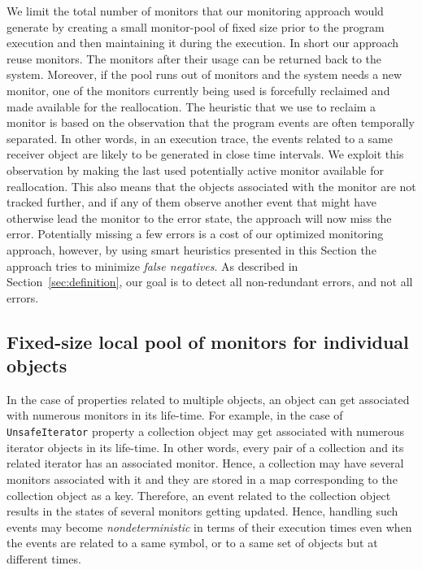 We limit the total number of 
monitors that our monitoring approach would generate by creating a small 
monitor-pool of fixed size prior to the program execution and then maintaining 
it during the execution. In short our approach reuse monitors. The monitors 
after their usage can be returned back to the system. Moreover, if the pool runs 
out of monitors and the system needs a new monitor, one of the monitors currently being 
used is forcefully reclaimed and made available for the reallocation. The 
heuristic that we use to reclaim a monitor is based on the observation that the 
program events are often temporally separated. In other words, in an execution 
trace, the events related to a same receiver object are likely to be generated 
in close time intervals. We exploit this observation by making the last used potentially active 
monitor available for reallocation. This also means that the objects associated with the monitor
are not tracked further, and if any of them observe another event that might have otherwise
lead the monitor to the error state, the approach will now miss the error. 
Potentially missing a few errors is a cost of our optimized monitoring approach, 
however, by using smart heuristics presented in this Section the approach tries to
minimize \textit{false negatives}. As described in Section~\ref{sec:definition}, our
goal is to detect all non-redundant errors, and not all errors.

\subsection{Fixed-size local pool of monitors for individual objects}

In the case of properties related to multiple objects, 
an object can get associated with numerous monitors in its life-time. For example,
in the case of \texttt{UnsafeIterator} property a collection object may get associated
with numerous iterator objects in its life-time. In other words, every pair of a collection and its related
iterator has an associated monitor. Hence, a collection may have several monitors associated with it
and they are stored in a map corresponding to the collection object as a key.
Therefore, an event related to the collection object results in the states of 
several monitors getting updated. Hence, handling such events may become 
\textit{nondeterministic} in terms of their execution times even when the events are related
to a same symbol, or to a same set of objects but at different times.

